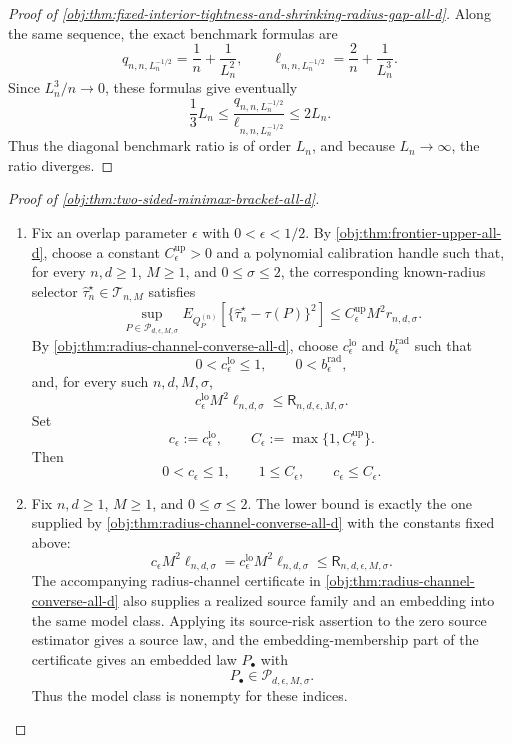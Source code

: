 \begin{proof}[Proof of \cref{obj:thm:fixed-interior-tightness-and-shrinking-radius-gap-all-d}]
Along the same sequence, the exact benchmark formulas are
\[
q_{n,n,L_n^{-1/2}}=\frac1n+\frac1{L_n^2},\qquad
\ell_{n,n,L_n^{-1/2}}=\frac2n+\frac1{L_n^3}.
\]
Since \(L_n^3/n\to0\), these formulas give eventually
\[
\frac13 L_n
\le
\frac{q_{n,n,L_n^{-1/2}}}{\ell_{n,n,L_n^{-1/2}}}
\le
2L_n.
\]
Thus the diagonal benchmark ratio is of order \(L_n\), and because \(L_n\to\infty\), the ratio diverges.
\end{proof}

\begin{proof}[Proof of \cref{obj:thm:two-sided-minimax-bracket-all-d}]
\begin{enumerate}
\item Fix an overlap parameter \(\epsilon\) with \(0<\epsilon<1/2\).  By
\cref{obj:thm:frontier-upper-all-d}, choose a constant
\(C_{\epsilon}^{\mathrm{up}}>0\) and a polynomial calibration handle such that, for every
\(n,d\ge1\), \(M\ge1\), and \(0\le\sigma\le2\), the corresponding known-radius selector
\(\widehat\tau_n^{\star}\in\mathcal T_{n,M}\) satisfies
\[
\sup_{P\in\mathcal P_{d,\epsilon,M,\sigma}}
E_{Q_P^{(n)}}\!\left[
\{\widehat\tau_n^{\star}-\tau(P)\}^2
\right]
\le
C_{\epsilon}^{\mathrm{up}}M^2 r_{n,d,\sigma}.
\]
By \cref{obj:thm:radius-channel-converse-all-d}, choose
\(c_{\epsilon}^{\mathrm{lo}}\) and \(b_{\epsilon}^{\mathrm{rad}}\) such that
\[
0<c_{\epsilon}^{\mathrm{lo}}\le1,\qquad 0<b_{\epsilon}^{\mathrm{rad}},
\]
and, for every such \(n,d,M,\sigma\),
\[
c_{\epsilon}^{\mathrm{lo}}M^2\ell_{n,d,\sigma}
\le
\mathsf R_{n,d,\epsilon,M,\sigma}.
\]
Set
\[
c_{\epsilon}:=c_{\epsilon}^{\mathrm{lo}},
\qquad
C_{\epsilon}:=\max\{1,C_{\epsilon}^{\mathrm{up}}\}.
\]
Then
\[
0<c_{\epsilon}\le1,\qquad 1\le C_{\epsilon},\qquad c_{\epsilon}\le C_{\epsilon}.
\] %

\item Fix \(n,d\ge1\), \(M\ge1\), and \(0\le\sigma\le2\).  The lower bound is exactly the
one supplied by \cref{obj:thm:radius-channel-converse-all-d} with the constants fixed above:
\[
c_{\epsilon}M^2\ell_{n,d,\sigma}
=
c_{\epsilon}^{\mathrm{lo}}M^2\ell_{n,d,\sigma}
\le
\mathsf R_{n,d,\epsilon,M,\sigma}.
\]
The accompanying radius-channel certificate in
\cref{obj:thm:radius-channel-converse-all-d} also supplies a realized source family and an
embedding into the same model class.  Applying its source-risk assertion to the zero source
estimator gives a source law, and the embedding-membership part of the certificate gives an
embedded law \(P_{\bullet}\) with
\[
P_{\bullet}\in\mathcal P_{d,\epsilon,M,\sigma}.
\]
Thus the model class is nonempty for these indices. %


\end{enumerate}
\end{proof}
